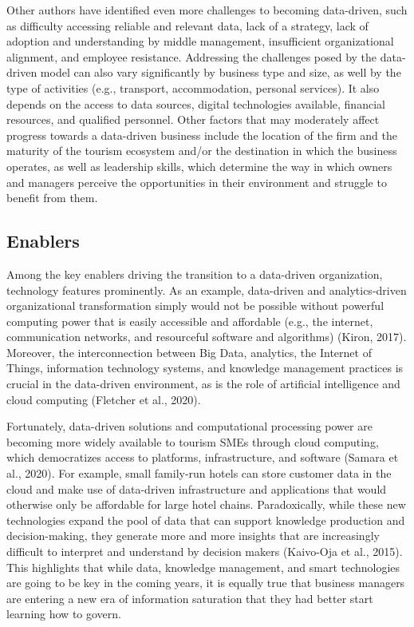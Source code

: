 \documentclass[
  letterpaper,
  DIV=11,
  numbers=noendperiod]{scrreprt}
\begin{document}
Other authors have identified even more challenges to becoming
data-driven, such as difficulty accessing reliable and relevant data,
lack of a strategy, lack of adoption and understanding by middle
management, insufficient organizational alignment, and employee
resistance. Addressing the challenges posed by the data-driven model can
also vary significantly by business type and size, as well by the type
of activities (e.g., transport, accommodation, personal services). It
also depends on the access to data sources, digital technologies
available, financial resources, and qualified personnel. Other factors
that may moderately affect progress towards a data-driven business
include the location of the firm and the maturity of the tourism
ecosystem and/or the destination in which the business operates, as well
as leadership skills, which determine the way in which owners and
managers perceive the opportunities in their environment and struggle to
benefit from them.

\hypertarget{enablers}{%
\subsection{Enablers}\label{enablers}}

Among the key enablers driving the transition to a data-driven
organization, technology features prominently. As an example,
data-driven and analytics-driven organizational transformation simply
would not be possible without powerful computing power that is easily
accessible and affordable (e.g., the internet, communication networks,
and resourceful software and algorithms) (Kiron, 2017). Moreover, the
interconnection between Big Data, analytics, the Internet of Things,
information technology systems, and knowledge management practices is
crucial in the data-driven environment, as is the role of artificial
intelligence and cloud computing (Fletcher et al., 2020).

Fortunately, data-driven solutions and computational processing power
are becoming more widely available to tourism SMEs through cloud
computing, which democratizes access to platforms, infrastructure, and
software (Samara et al., 2020). For example, small family-run hotels can
store customer data in the cloud and make use of data-driven
infrastructure and applications that would otherwise only be affordable
for large hotel chains. Paradoxically, while these new technologies
expand the pool of data that can support knowledge production and
decision-making, they generate more and more insights that are
increasingly difficult to interpret and understand by decision makers
(Kaivo-Oja et al., 2015). This highlights that while data, knowledge
management, and smart technologies are going to be key in the coming
years, it is equally true that business managers are entering a new era
of information saturation that they had better start learning how to
govern.
\end{document}
